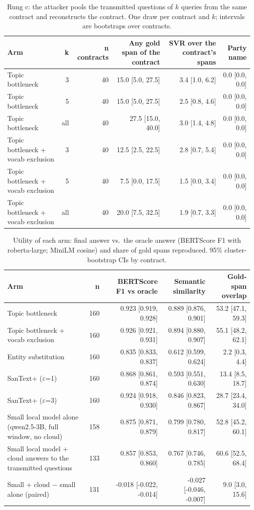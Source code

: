 \begin{table}[t]
\centering\small
\caption{Rung c: the attacker pools the transmitted questions of $k$ queries from the same contract and reconstructs the contract. One draw per contract and $k$; intervals are bootstraps over contracts.}
\label{tab:multiquery}
\begin{tabular}{lrrrrr}
\toprule
Arm & k & n contracts & Any gold span of the contract & SVR over the contract's spans & Party name \\
\midrule
Topic bottleneck & 3 & 40 & 15.0 [5.0, 27.5] & 3.4 [1.0, 6.2] & 0.0 [0.0, 0.0] \\
Topic bottleneck & 5 & 40 & 15.0 [5.0, 27.5] & 2.5 [0.8, 4.6] & 0.0 [0.0, 0.0] \\
Topic bottleneck & all & 40 & 27.5 [15.0, 40.0] & 3.0 [1.4, 4.8] & 0.0 [0.0, 0.0] \\
Topic bottleneck + vocab exclusion & 3 & 40 & 12.5 [2.5, 22.5] & 2.8 [0.7, 5.4] & 0.0 [0.0, 0.0] \\
Topic bottleneck + vocab exclusion & 5 & 40 & 7.5 [0.0, 17.5] & 1.5 [0.0, 3.4] & 0.0 [0.0, 0.0] \\
Topic bottleneck + vocab exclusion & all & 40 & 20.0 [7.5, 32.5] & 1.9 [0.7, 3.3] & 0.0 [0.0, 0.0] \\
\bottomrule
\end{tabular}
\end{table}

\begin{table}[t]
\centering\small
\caption{Utility of each arm: final answer vs.\ the oracle answer (BERTScore F1 with roberta-large; MiniLM cosine) and share of gold spans reproduced. 95\% cluster-bootstrap CIs by contract.}
\label{tab:utility}
\begin{tabular}{lrrrr}
\toprule
Arm & n & BERTScore F1 vs oracle & Semantic similarity & Gold-span overlap \\
\midrule
Topic bottleneck & 160 & 0.923 [0.919, 0.928] & 0.889 [0.876, 0.901] & 53.2 [47.1, 59.3] \\
Topic bottleneck + vocab exclusion & 160 & 0.926 [0.921, 0.931] & 0.894 [0.880, 0.907] & 55.1 [48.2, 62.1] \\
Entity substitution & 160 & 0.835 [0.833, 0.837] & 0.612 [0.599, 0.624] & 2.2 [0.3, 4.4] \\
SanText+ ($\varepsilon$=1) & 160 & 0.868 [0.861, 0.874] & 0.593 [0.551, 0.630] & 13.4 [8.5, 18.7] \\
SanText+ ($\varepsilon$=3) & 160 & 0.924 [0.918, 0.930] & 0.846 [0.823, 0.867] & 28.7 [23.4, 34.0] \\
Small local model alone (qwen2.5-3B, full window, no cloud) & 158 & 0.875 [0.871, 0.879] & 0.799 [0.780, 0.817] & 52.8 [45.2, 60.1] \\
Small local model + cloud answers to the transmitted questions & 133 & 0.857 [0.853, 0.860] & 0.767 [0.746, 0.785] & 60.6 [52.5, 68.4] \\
Small + cloud $-$ small alone (paired) & 131 & -0.018 [-0.022, -0.014] & -0.027 [-0.046, -0.007] & 9.0 [3.0, 15.6] \\
\bottomrule
\end{tabular}
\end{table}

